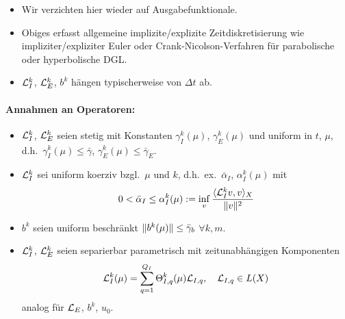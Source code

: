 \begin{bem} \beginwithlistbem
	\begin{itemize}
		\item Wir verzichten hier wieder auf Ausgabefunktionale.
		\item Obiges erfasst allgemeine implizite/explizite Zeitdiskretisierung wie impliziter/expliziter Euler oder Crank-Nicolson-Verfahren für parabolische oder hyperbolische DGL.
		\item $\mathcal{L}_I^k$, $\mathcal{L}_E^k$, $b^k$ hängen typischerweise von $\Delta t$ ab.
	\end{itemize}
\end{bem}

\paragraph{Annahmen an Operatoren:}

\begin{itemize}
	\item $\mathcal{L}_I^k$, $\mathcal{L}_E^k$ seien stetig mit Konstanten $\gamma_I^k(\mu)$, $\gamma_E^k(\mu)$ und uniform in $t$, $\mu$, d.h.\ $\gamma_I^k(\mu) \leq \bar\gamma$, $\gamma_E^k(\mu) \leq \bar\gamma_E$.
	\item $\mathcal{L}_I^k$ sei uniform koerziv bzgl.\ $\mu$ und $k$, d.h.\ ex.\ $\bar\alpha_I$, $\alpha_I^k(\mu)$ mit
		\[
			0 < \bar\alpha_I \leq \alpha_I^k(\mu) := \inf_v \frac{\langle \mathcal{L}_I^k v, v \rangle_X}{\|v\|^2}
		\]
	\item $b^k$ seien uniform beschränkt $\|b^k(\mu)\| \leq \bar\gamma_b$ $\forall k, m$.
	\item $\mathcal{L}_I^k$, $\mathcal{L}_E^k$ seien separierbar parametrisch mit zeitunabhängigen Komponenten
		\[
			\mathcal{L}_I^k(\mu) = \sum_{q=1}^{Q_I} \Theta_{I,q}^k(\mu) \mathcal{L}_{I,q}, \quad \mathcal{L}_{I,q} \in L(X)
		\]
		analog für $\mathcal{L}_E$, $b^k$, $u_0$.
\end{itemize}
